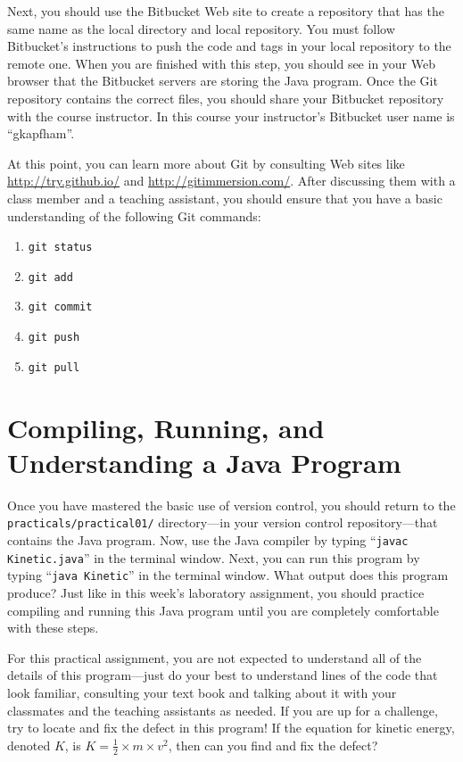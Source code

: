 Next, you should use the Bitbucket Web site to create a repository that has the same name as the local directory and
local repository.  You must follow Bitbucket's instructions to push the code and tags in your local repository to the
remote one. When you are finished with this step, you should see in your Web browser that the Bitbucket servers are
storing the Java program. Once the Git repository contains the correct files, you should share your Bitbucket repository
with the course instructor. In this course your instructor's Bitbucket user name is ``gkapfham''.

At this point, you can learn more about Git by consulting Web sites like \url{http://try.github.io/} and
\url{http://gitimmersion.com/}.  After discussing them with a class member and a teaching assistant, you should ensure
that you have a basic understanding of the following Git commands:

\vspace*{-.125in}
\begin{enumerate}
  \setlength{\itemsep}{-.03in}
  \item {\tt git status}
  \item {\tt git add}
  \item {\tt git commit}
  \item {\tt git push}
  \item {\tt git pull}
\end{enumerate}
\vspace*{-.15in}

\section*{Compiling, Running, and Understanding a Java Program}

Once you have mastered the basic use of version control, you should return to the \\ {\tt practicals/practical01/}
directory---in your version control repository---that contains the Java program. Now, use the Java compiler by typing
``{\tt javac Kinetic.java}'' in the terminal window.  Next, you can run this program by typing ``{\tt java Kinetic}'' in
the terminal window.  What output does this program produce?  Just like in this week's laboratory assignment, you should
practice compiling and running this Java program until you are completely comfortable with these steps.

For this practical assignment, you are not expected to understand all of the details of this program---just do your best
to understand lines of the code that look familiar, consulting your text book and talking about it with your classmates
and the teaching assistants as needed. If you are up for a challenge, try to locate and fix the defect in this program!
If the equation for kinetic energy, denoted $K$, is $K=\frac{1}{2} \times m \times v^2$, then can you find and fix the
defect?

